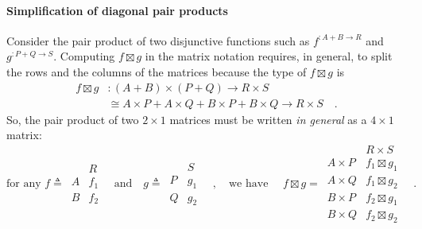 \paragraph{Simplification of diagonal pair products}

Consider the pair product of two disjunctive functions such as $f^{:A+B\rightarrow R}$
and $g^{:P+Q\rightarrow S}$. Computing $f\boxtimes g$ in the matrix
notation requires, in general, to split the rows and the columns of
the matrices because the type of $f\boxtimes g$ is 
\begin{align*}
f\boxtimes g & :(A+B)\times(P+Q)\rightarrow R\times S\\
 & \cong A\times P+A\times Q+B\times P+B\times Q\rightarrow R\times S\quad.
\end{align*}
So, the pair product of two $2\times1$ matrices must be written \emph{in
general} as a $4\times1$ matrix:
\[
\text{for any }f\triangleq\,\begin{array}{|c||c|}
 & R\\
\hline A & f_{1}\\
B & f_{2}
\end{array}\quad\text{and}\quad g\triangleq\,\begin{array}{|c||c|}
 & S\\
\hline P & g_{1}\\
Q & g_{2}
\end{array}\quad,\quad\text{we have }\quad f\boxtimes g=\,\begin{array}{|c||c|}
 & R\times S\\
\hline A\times P & f_{1}\boxtimes g_{1}\\
A\times Q & f_{1}\boxtimes g_{2}\\
B\times P & f_{2}\boxtimes g_{1}\\
B\times Q & f_{2}\boxtimes g_{2}
\end{array}\quad.
\]

